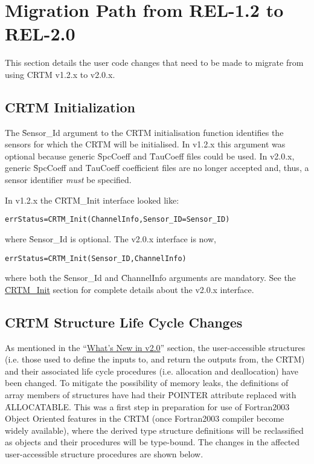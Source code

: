 \chapter{Migration Path from REL-1.2 to REL-2.0}
\label{sec:migration_path}

This section details the user code changes that need to be made to migrate from using CRTM v1.2.x to v2.0.x.

\section{CRTM Initialization}
\label{sec:mp_crtm_init}

The \f{Sensor\_Id} argument to the CRTM initialisation function identifies the sensors for which the CRTM will be initialised. In v1.2.x this argument was optional because generic \f{SpcCoeff} and \f{TauCoeff} files could be used. In v2.0.x, generic \f{SpcCoeff} and \f{TauCoeff} coefficient files are no longer accepted and, thus, a sensor identifier \emph{must} be specified.

In v1.2.x the \f{CRTM\_Init} interface looked like:
\begin{alltt}
  errStatus = CRTM_Init( ChannelInfo, Sensor_ID=Sensor_ID )\end{alltt}
where \f{Sensor\_Id} is optional. The v2.0.x interface is now,
\begin{alltt}
  errStatus = CRTM_Init( Sensor_ID, ChannelInfo )\end{alltt}
where both the \f{Sensor\_Id} and \f{ChannelInfo} arguments are mandatory. See the \hyperref[sec:CRTM_Init_interface]{\f{CRTM\_Init}} section for complete details about the v2.0.x interface.


\section{CRTM Structure Life Cycle Changes}
\label{sec:mp_crtm_life_cycle}

As mentioned in the ``\hyperref[sec:new_interface_changes]{What's New in v2.0}'' section, the user-accessible structures (i.e. those used to define the inputs to, and return the outputs from, the CRTM) and their associated life cycle procedures (i.e. allocation and deallocation) have been changed. To mitigate the possibility of memory leaks, the definitions of array members of structures have had their \f{POINTER} attribute replaced with \f{ALLOCATABLE}. This was a first step in preparation for use of Fortran2003 Object Oriented features in the CRTM (once Fortran2003 compiler become widely available), where the derived type structure definitions will be reclassified as objects and their procedures will be type-bound. The changes in the affected user-accessible structure procedures are shown below.

